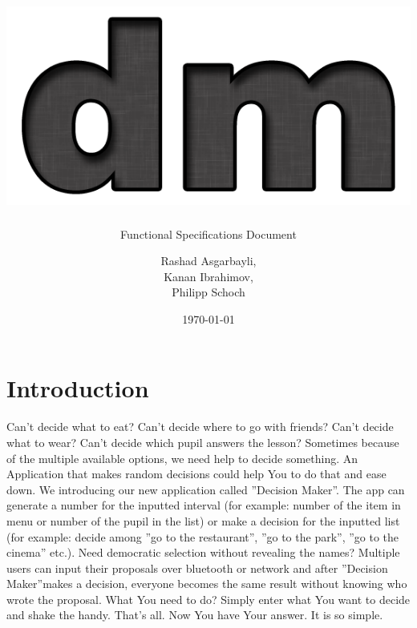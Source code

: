 \documentclass[hidelinks, a4paper, 11pt]{scrartcl}
\author{Rashad Asgarbayli,\\ Kanan Ibrahimov,\\ Philipp Schoch}
\title{\vspace{3cm}\includegraphics[scale=0.7]{Logo.png}\\ \app\vspace{20mm}}
\subtitle{Functional Specifications Document}
\date{\today}
\def\app{''Decision Maker''}
\begin{document}
\maketitle
\thispagestyle{empty}

\newpage

\tableofcontents

\newpage


\section{Introduction}

\paragraph{}Can't decide what to eat? Can't decide where to go with friends? Can't decide what to wear? Can't decide which pupil answers the lesson? Sometimes because of the multiple available options, we need help to decide something. An Application that makes random decisions could help You to do that and ease down. We introducing our new application called \app. The app can generate a number for the inputted interval (for example: number of the item in menu or number of the pupil in the list) or make a decision for the inputted list (for example: decide among ''go to the restaurant'', ''go to the park'', ''go to the cinema'' etc.). Need democratic selection without revealing the names? Multiple users can input their proposals over bluetooth or network and after \app makes a decision, everyone becomes the same result without knowing who wrote the proposal. What You need to do? Simply enter what You want to decide and shake the handy. That's all. Now You have Your answer. It is so simple.




















\end{document}
